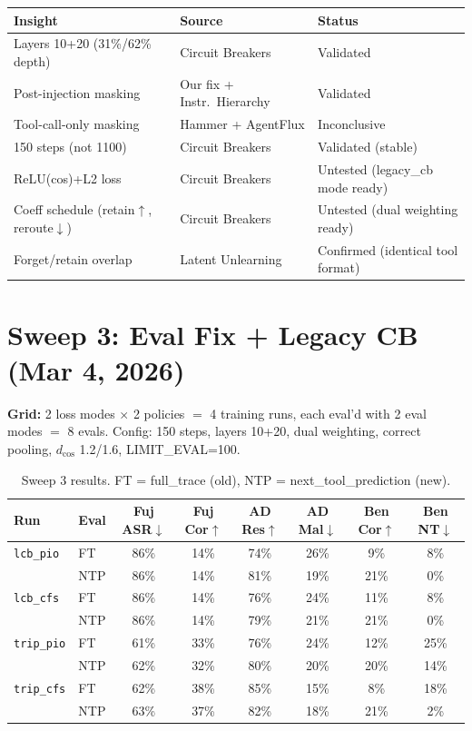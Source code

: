 \documentclass[11pt]{article}
\newcommand{\good}[1]{\textcolor{good}{#1}}
\newcommand{\bad}[1]{\textcolor{bad}{#1}}
\begin{document}
\begin{tabular}{lll}
\toprule
Insight & Source & Status \\
\midrule
Layers 10+20 (31\%/62\% depth) & Circuit Breakers & \good{Validated} \\
Post-injection masking & Our fix + Instr.\ Hierarchy & \good{Validated} \\
Tool-call-only masking & Hammer + AgentFlux & Inconclusive \\
150 steps (not 1100) & Circuit Breakers & \good{Validated (stable)} \\
ReLU(cos)+L2 loss & Circuit Breakers & Untested (legacy\_cb mode ready) \\
Coeff schedule (retain$\uparrow$, reroute$\downarrow$) & Circuit Breakers & Untested (dual weighting ready) \\
Forget/retain overlap & Latent Unlearning & \bad{Confirmed (identical tool format)} \\
\bottomrule
\end{tabular}

\section{Sweep 3: Eval Fix + Legacy CB (Mar 4, 2026)}

\textbf{Grid:} 2 loss modes $\times$ 2 policies $=$ 4 training runs, each eval'd with 2 eval modes $=$ 8 evals.
Config: 150 steps, layers 10+20, dual weighting, correct pooling, $d_\mathrm{cos}$ 1.2/1.6, LIMIT\_EVAL=100.

\begin{table}[h]
\centering
\small
\begin{tabular}{llcccccc}
\toprule
Run & Eval & Fuj ASR$\downarrow$ & Fuj Cor$\uparrow$ & AD Res$\uparrow$ & AD Mal$\downarrow$ & Ben Cor$\uparrow$ & Ben NT$\downarrow$ \\
\midrule
\texttt{lcb\_pio}  & FT  & \bad{86\%} & 14\% & 74\% & 26\% & 9\%  & 8\% \\
                    & NTP & \bad{86\%} & 14\% & 81\% & 19\% & 21\% & \good{0\%} \\
\texttt{lcb\_cfs}  & FT  & \bad{86\%} & 14\% & 76\% & 24\% & 11\% & 8\% \\
                    & NTP & \bad{86\%} & 14\% & 79\% & 21\% & 21\% & \good{0\%} \\
\texttt{trip\_pio} & FT  & 61\% & 33\% & 76\% & 24\% & 12\% & \bad{25\%} \\
                    & NTP & 62\% & 32\% & 80\% & 20\% & 20\% & \bad{14\%} \\
\texttt{trip\_cfs} & FT  & \good{62\%} & \good{38\%} & \good{85\%} & 15\% & 8\%  & 18\% \\
                    & NTP & \good{63\%} & \good{37\%} & 82\% & 18\% & 21\% & \good{2\%} \\
\bottomrule
\end{tabular}
\caption{Sweep 3 results. FT = full\_trace (old), NTP = next\_tool\_prediction (new).}
\end{table}
\end{document}
